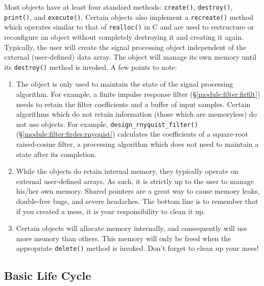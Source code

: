 Most objects have at least four standard methods:
{\tt create()},
{\tt destroy()},
{\tt print()},
and
{\tt execute()}.
Certain objects also implement a {\tt recreate()} method which operates
similar to that of {\tt realloc()} in C and are used to restructure or
reconfigure an object without completely destroying it and creating it again.
Typically, the user will create the signal processing object independent of
the external (user-defined) data array.
The object will manage its own memory until its {\tt destroy()} method is
invoked.
A few points to note:
\begin{enumerate}
\item The object is only used to maintain the state of the signal processing
      algorithm.
      For example, a finite impulse response filter
      (\S\ref{module:filter:firfilt}) needs to retain the filter
      coefficients and a buffer of input samples.
      Certain algorithms which do not retain information (those which are
      memoryless) do not use objects.
      For example, {\tt design\_rnyquist\_filter()}
      (\S\ref{module:filter:firdes:rnyquist})
      calculates the coefficients of a square-root raised-cosine filter,
      a processing algorithm which does not need to maintain a state
      after its completion.
\item While the objects do retain internal memory, they typically operate on
      external user-defined arrays.
      As such, it is strictly up to the user to manage his/her own
      memory.
      Shared pointers are a great way to cause memory leaks, double-free
      bugs, and severe headaches.
      The bottom line is to remember that if you created a mess, it is
      your responsibility to clean it up.
\item Certain objects will allocate memory internally, and consequently
      will use more memory than others.
      This memory will only be freed when the appropriate {\tt delete()}
      method is invoked.
      Don't forget to clean up your mess!
\end{enumerate}


\subsection{Basic Life Cycle}
\label{section:data_structures:lifecycle}

